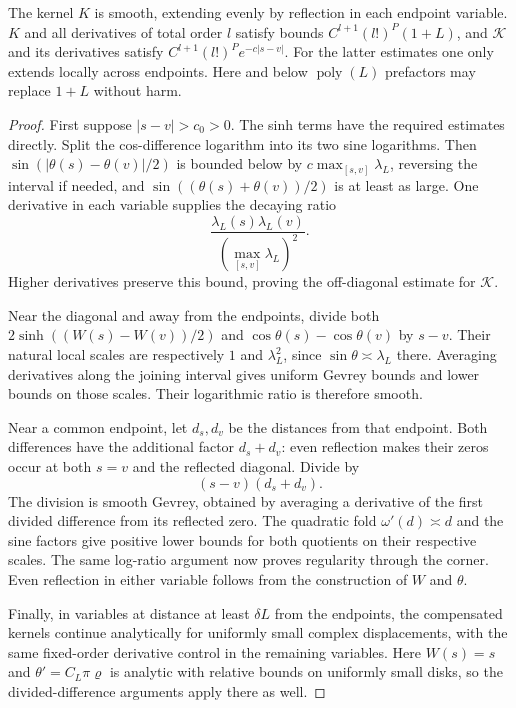 \begin{lemma}\label{lem:03-kernel-regularity}
The kernel \(K\) is smooth, extending evenly by reflection in each endpoint variable. \(K\) and all derivatives of total order \(l\) satisfy bounds \(C^{l+1}(l!)^P(1+L)\), and
\(\mathscr K\) and its derivatives satisfy \(C^{l+1}(l!)^P e^{-c|s-v|}\). For the latter estimates one only extends locally across endpoints. Here and below \(\operatorname{poly}(L)\) prefactors may replace \(1+L\) without harm.

\end{lemma}
\begin{proof}
First suppose \(|s-v|>c_0>0\). The sinh terms have the required estimates directly. Split the cos-difference logarithm into its two sine logarithms. Then
\(\sin(|\theta(s)-\theta(v)|/2)\) is bounded below by \(c\max_{[s,v]}\lambda_L\), reversing the interval if needed, and \(\sin((\theta(s)+\theta(v))/2)\) is at least as large. One derivative in each variable supplies the decaying ratio
\[
 \frac{\lambda_L(s)\lambda_L(v)}{(\max_{[s,v]}\lambda_L)^2}.
\]
Higher derivatives preserve this bound, proving the off-diagonal estimate for \(\mathscr K\).

Near the diagonal and away from the endpoints, divide both \(2\sinh((W(s)-W(v))/2)\) and \(\cos\theta(s)-\cos\theta(v)\) by \(s-v\). Their natural local scales are respectively \(1\) and \(\lambda_L^2\), since \(\sin\theta\asymp\lambda_L\) there. Averaging derivatives along the joining interval gives uniform Gevrey bounds and lower bounds on those scales. Their logarithmic ratio is therefore smooth.

Near a common endpoint, let \(d_s,d_v\) be the distances from that endpoint. Both differences have the additional factor \(d_s+d_v\): even reflection makes their zeros occur at both \(s=v\) and the reflected diagonal. Divide by
\[
 (s-v)(d_s+d_v).
\]
The division is smooth Gevrey, obtained by averaging a derivative of the first divided difference from its reflected zero. The quadratic fold \(\omega'(d)\asymp d\) and the sine factors give positive lower bounds for both quotients on their respective scales. The same log-ratio argument now proves regularity through the corner. Even reflection in either variable follows from the construction of \(W\) and \(\theta\).

Finally, in variables at distance at least \(\delta L\) from the endpoints, the compensated kernels continue analytically for uniformly small complex displacements, with the same fixed-order derivative control in the remaining variables. Here \(W(s)=s\) and \(\theta'=C_L\pi\varrho\) is analytic with relative bounds on uniformly small disks, so the divided-difference arguments apply there as well.
\end{proof}

